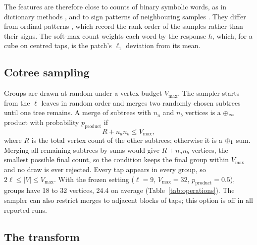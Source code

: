The features are therefore close to counts of binary symbolic words, as in dictionary
methods \citep{lin2007sax,schaefer2023weasel2}, and to sign patterns of neighbouring
samples \citep{kaya2014lbp}. They differ from ordinal patterns \citep{bandt2002permutation},
which record the rank order of the samples rather than their signs. The soft-max count
weights each word by the response $h$, which, for a cube on centred taps, is the patch's
$\ell_1$ deviation from its mean.

\subsection{Cotree sampling}
\label{sec:sampling}

Groups are drawn at random under a vertex budget $V_{\max}$. The sampler starts from the
$\ell$ leaves in random order and merges two randomly chosen subtrees until one tree
remains. A merge of subtrees with $n_a$ and $n_b$ vertices is a $\oplus_\infty$ product with
probability $p_{\text{product}}$ if
\[
  R + n_a n_b \le V_{\max},
\]
where $R$ is the total vertex count of the other subtrees; otherwise it is a $\oplus_1$ sum.
Merging all remaining subtrees by sums would give $R+n_an_b$ vertices, the smallest
possible final count, so the condition keeps the final group within $V_{\max}$ and no draw
is ever rejected. Every tap appears in every group, so $2\ell\le|V|\le V_{\max}$. With the
frozen setting ($\ell=9$, $V_{\max}=32$, $p_{\text{product}}=0.5$), groups have 18 to 32
vertices, 24.4 on average (Table~\ref{tab:operations}). The sampler can also restrict
merges to adjacent blocks of taps; this option is off in all reported runs.

\subsection{The transform}
\label{sec:transform}

